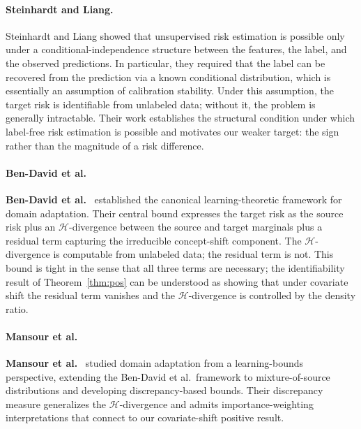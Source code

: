 \paragraph{Steinhardt and Liang.}
Steinhardt and Liang showed that unsupervised risk estimation is possible only
under a conditional-independence structure between the features, the label,
and the observed predictions.
In particular, they required that the label can be recovered from the
prediction via a known conditional distribution, which is essentially an
assumption of calibration stability.
Under this assumption, the target risk is identifiable from unlabeled data;
without it, the problem is generally intractable.
Their work establishes the structural condition under which label-free risk
estimation is possible and motivates our weaker target: the sign rather
than the magnitude of a risk difference.

\paragraph{Ben-David et al.}
\textbf{Ben-David et al.}~\cite{bendavid2010theory} established the canonical
learning-theoretic framework for domain adaptation.
Their central bound expresses the target risk as the source risk plus an
$\mathcal{H}$-divergence between the source and target marginals plus a
residual term capturing the irreducible concept-shift component.
The $\mathcal{H}$-divergence is computable from unlabeled data; the residual
term is not.
This bound is tight in the sense that all three terms are necessary; the
identifiability result of Theorem~\ref{thm:pos} can be understood as showing
that under covariate shift the residual term vanishes and the $\mathcal{H}$-divergence
is controlled by the density ratio.

\paragraph{Mansour et al.}
\textbf{Mansour et al.}~\cite{mansour2009domain} studied domain adaptation
from a learning-bounds perspective, extending the Ben-David et al.\ framework
to mixture-of-source distributions and developing discrepancy-based bounds.
Their discrepancy measure generalizes the $\mathcal{H}$-divergence and admits
importance-weighting interpretations that connect to our covariate-shift
positive result.

